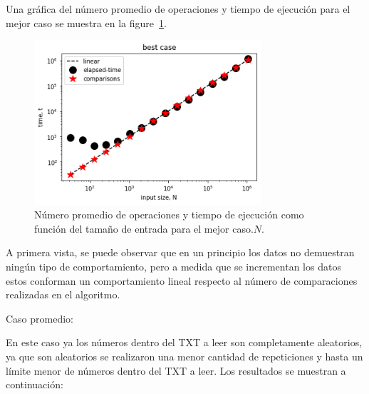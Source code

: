 Una gráfica del número promedio de operaciones y tiempo de ejecución para el mejor caso se muestra en la figure~\ref{fig:best}.

\begin{figure}[H]
	\centering
	\includegraphics[keepaspectratio, width = 0.75\textwidth]{bestc.png}
	\caption{
		Número promedio de operaciones y tiempo de ejecución como función del tamaño de entrada para el mejor caso.$N$.
	}
	\label{fig:best}
\end{figure}

A primera vista, se puede observar que en un principio los datos no demuestran ningún tipo de comportamiento, pero a medida que se incrementan los datos estos conforman un comportamiento lineal respecto al número de comparaciones realizadas en el algoritmo. 

Caso promedio: 

En este caso ya los números dentro del TXT a leer son completamente aleatorios, ya que son aleatorios se realizaron una menor cantidad de repeticiones y hasta un límite menor de números dentro del TXT a leer. Los resultados se muestran a continuación: 


